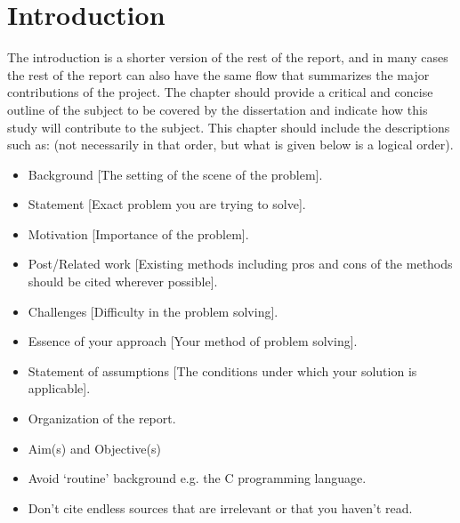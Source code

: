 \chapter{Introduction}

The introduction is a shorter version of the rest of the report, and in many cases the rest of the report can 
also have the same flow that summarizes the major contributions of the project. The chapter should provide a 
critical and concise outline of the subject to be covered by the dissertation and indicate how this study will 
contribute to the subject. This chapter should include the descriptions such as: (not necessarily in that order, 
but what is given below is a logical order). 
\begin{itemize}
	\item Background [The setting of the scene of the problem].
	\item Statement [Exact problem you are trying to solve]. 
	\item Motivation [Importance of the problem]. 
	\item Post/Related work [Existing methods including pros and cons of the methods should be cited wherever possible].
	\item Challenges [Difficulty in the problem solving].
	\item Essence of your approach [Your method of problem solving].
	\item Statement of assumptions [The conditions under which your solution is applicable].  
	\item Organization of the report. 
	\item Aim(s) and Objective(s)
	\item Avoid ‘routine’ background e.g. the C programming language.
	\item Don’t cite endless sources that are irrelevant or that you haven’t read.
\end{itemize}